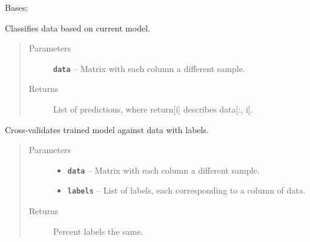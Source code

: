 \documentclass[letterpaper,10pt,english]{sphinxmanual}
\begin{document}
\begin{fulllineitems}
\label{eigenfish.classify:eigenfish.classify.classify.Classifier}
Bases: 

\begin{fulllineitems}
\label{eigenfish.classify:eigenfish.classify.classify.Classifier.classify}
Classifies data based on current model.
\begin{quote}\begin{description}
\item[{Parameters}] \leavevmode
\textbf{\texttt{data}} -- Matrix with each column a different sample.

\item[{Returns}] \leavevmode
List of predictions, where return{[}i{]} describes data{[}:, i{]}.

\end{description}\end{quote}

\end{fulllineitems}


\begin{fulllineitems}
\label{eigenfish.classify:eigenfish.classify.classify.Classifier.cross_validate}
Cross-validates trained model against data with labels.
\begin{quote}\begin{description}
\item[{Parameters}] \leavevmode\begin{itemize}
\item {} 
\textbf{\texttt{data}} -- Matrix with each column a different sample.

\item {} 
\textbf{\texttt{labels}} -- List of labels, each corresponding to a column of data.

\end{itemize}

\item[{Returns}] \leavevmode
Percent labels the same.

\end{description}\end{quote}


\end{fulllineitems}
\end{fulllineitems}
\end{document}
